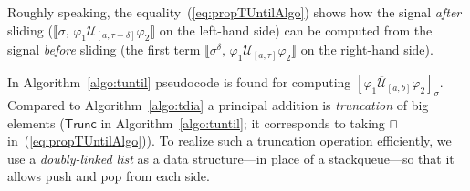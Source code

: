 \documentclass[envcountsect,orivec]{llncs} \usepackage{etex} \usepackage[]{graphicx}
\newcommand{\UntilOp}[1]{\mathbin{\mathcal{U}_{#1}}}
\newcommand{\TUntil}[1]{\mathbin{\overline{\mathcal{U}}_{#1}}}
\newcommand{\Robust}[2]{{ \llbracket #1,\, #2 \rrbracket}}
\begin{document}
Roughly speaking, the equality~(\ref{eq:propTUntilAlgo}) shows how the
signal \emph{after} sliding ($\Robust{\sigma}{\varphi_1 \UntilOp{[a,
\tau + \delta]} \varphi_2}$ on the left-hand side) can be computed from
the signal \emph{before} sliding (the first term 
$\Robust{\sigma^\delta}{\varphi_1 \UntilOp{[a, \tau]} \varphi_2}$
on the right-hand side). 

In Algorithm~\ref{algo:tuntil} pseudocode is found for 
computing 
$[\varphi_1 \TUntil{[a,b]} \varphi_2]_{\sigma}$. Compared to
Algorithm~\ref{algo:tdia} a principal addition is \emph{truncation} of
big elements ($\mathsf{Trunc}$ in Algorithm~\ref{algo:tuntil}; it
corresponds
to taking $\sqcap$ in~(\ref{eq:propTUntilAlgo})). To realize such a
truncation operation
efficiently, we use a \emph{doubly-linked list} as a data
structure---in place of a stackqueue---so that it allows push and pop
from each side.
\end{document}
